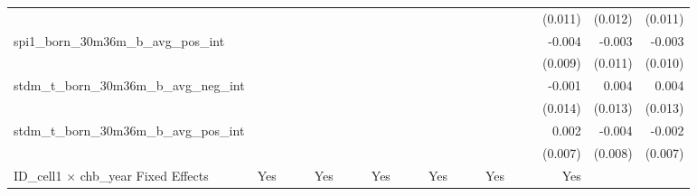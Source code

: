 \begin{tabular}{lrrrrrrrrrrrrrrrrrr}
                                            &              &              &              &              &              &              &              &              &               &              &              &               &              &              &               &      (0.011) &      (0.012) &       (0.011) \\ 
spi1\_born\_30m36m\_b\_avg\_pos\_int        &              &              &              &              &              &              &              &              &               &              &              &               &              &              &               &       -0.004 &       -0.003 &        -0.003 \\ 
                                            &              &              &              &              &              &              &              &              &               &              &              &               &              &              &               &      (0.009) &      (0.011) &       (0.010) \\ 
stdm\_t\_born\_30m36m\_b\_avg\_neg\_int     &              &              &              &              &              &              &              &              &               &              &              &               &              &              &               &       -0.001 &        0.004 &         0.004 \\ 
                                            &              &              &              &              &              &              &              &              &               &              &              &               &              &              &               &      (0.014) &      (0.013) &       (0.013) \\ 
stdm\_t\_born\_30m36m\_b\_avg\_pos\_int     &              &              &              &              &              &              &              &              &               &              &              &               &              &              &               &        0.002 &       -0.004 &        -0.002 \\ 
                                            &              &              &              &              &              &              &              &              &               &              &              &               &              &              &               &      (0.007) &      (0.008) &       (0.007) \\ 
\midrule
ID\_cell1 $\times$ chb\_year Fixed Effects  &          Yes &              &              &          Yes &              &              &          Yes &              &               &          Yes &              &               &          Yes &              &               &          Yes &              &               \\ 

\end{tabular}
